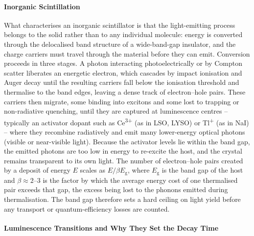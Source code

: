 \paragraph{Inorganic Scintillation}
What characterises an inorganic scintillator is that the light-emitting process belongs to the solid rather than to any individual molecule: energy is converted through the delocalised band structure of a wide-band-gap insulator, and the charge carriers must travel through the material before they can emit.
Conversion proceeds in three stages.
A  photon interacting photoelectrically or by Compton scatter liberates an energetic electron, which cascades by impact ionisation and Auger decay until the resulting carriers fall below the ionisation threshold and thermalise to the band edges, leaving a dense track of electron--hole pairs.
These carriers then migrate, some binding into excitons and some lost to trapping or non-radiative quenching, until they are captured at luminescence centres -- typically an activator dopant such as Ce\textsuperscript{3+} (as in LSO, LYSO) or Tl\textsuperscript{+} (as in NaI) -- where they recombine radiatively and emit many lower-energy optical photons (visible or near-visible light).
Because the activator levels lie within the band gap, the emitted photons are too low in energy to re-excite the host, and the crystal remains transparent to its own light.
The number of electron--hole pairs created by a deposit of energy $E$ scales as $E/\beta E_\mathrm{g}$, where $E_\mathrm{g}$ is the band gap of the host and $\beta \approx 2$--$3$ is the factor by which the average energy cost of one thermalised pair exceeds that gap, the excess being lost to the phonons emitted during thermalisation.
The band gap therefore sets a hard ceiling on light yield before any transport or quantum-efficiency losses are counted.

\paragraph{Luminescence Transitions and Why They Set the Decay Time}

